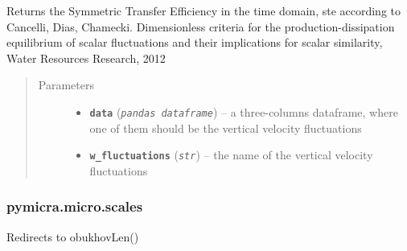 \documentclass[a4paper,10pt,oneside]{sphinxmanual}
\begin{document}

\begin{fulllineitems}
\label{pymicra.micro:pymicra.micro.functions.ste}
Returns the Symmetric Transfer Efficiency in the time domain, ste
according to Cancelli, Dias, Chamecki. Dimensionless criteria for the production-dissipation equilibrium
of scalar fluctuations and their implications for scalar similarity, Water Resources Research, 2012
\begin{quote}\begin{description}
\item[{Parameters}] \leavevmode\begin{itemize}
\item {} 
\textbf{\texttt{data}} (\emph{\texttt{pandas dataframe}}) -- a three-columns dataframe, where one of them should be the vertical velocity fluctuations

\item {} 
\textbf{\texttt{w\_fluctuations}} (\emph{\texttt{str}}) -- the name of the vertical velocity fluctuations

\end{itemize}

\end{description}\end{quote}

\end{fulllineitems}



\subsubsection{pymicra.micro.scales}
\label{pymicra.micro:module-pymicra.micro.scales}\label{pymicra.micro:pymicra-micro-scales}

\begin{fulllineitems}
\label{pymicra.micro:pymicra.micro.scales.MonObuLen}
Redirects to obukhovLen()

\end{fulllineitems}

\end{document}
